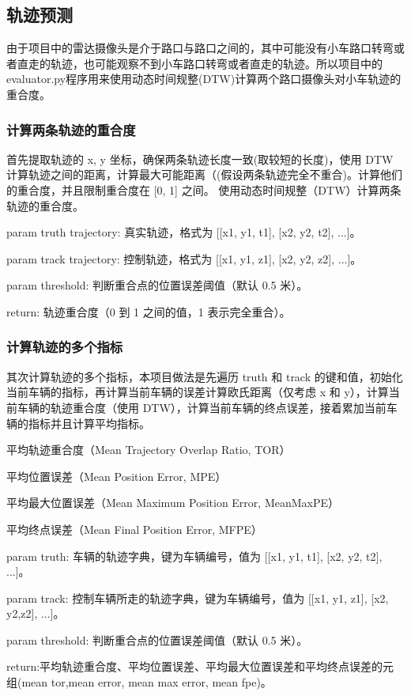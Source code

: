 \subsection{轨迹预测}
由于项目中的雷达摄像头是介于路口与路口之间的，其中可能没有小车路口转弯或者直走的轨迹，也可能观察不到小车路口转弯或者直走的轨迹。所以项目中的evaluator.py程序用来使用动态时间规整(DTW)计算两个路口摄像头对小车轨迹的重合度。
\subsubsection{计算两条轨迹的重合度}
首先提取轨迹的 x, y 坐标，确保两条轨迹长度一致(取较短的长度)，使用 DTW 计算轨迹之间的距离，计算最大可能距离（(假设两条轨迹完全不重合)。计算他们的重合度，并且限制重合度在 [0, 1] 之间。
使用动态时间规整（DTW）计算两条轨迹的重合度。

param truth trajectory: 真实轨迹，格式为 [[x1, y1, t1], [x2, y2, t2], ...]。

param track trajectory: 控制轨迹，格式为 [[x1, y1, z1], [x2, y2, z2], ...]。

param threshold: 判断重合点的位置误差阈值（默认 0.5 米）。

return: 轨迹重合度（0 到 1 之间的值，1 表示完全重合）。

\subsubsection{计算轨迹的多个指标}
其次计算轨迹的多个指标，本项目做法是先遍历 truth 和 track 的键和值，初始化当前车辆的指标，再计算当前车辆的误差计算欧氏距离（仅考虑 x 和 y），计算当前车辆的轨迹重合度（使用 DTW），计算当前车辆的终点误差，接着累加当前车辆的指标并且计算平均指标。

平均轨迹重合度（Mean Trajectory Overlap Ratio, TOR）

平均位置误差（Mean Position Error, MPE）

平均最大位置误差（Mean Maximum Position Error, MeanMaxPE）

平均终点误差（Mean Final Position Error, MFPE）

param truth: 车辆的轨迹字典，键为车辆编号，值为 [[x1, y1, t1], [x2, y2, t2], ...]。

param track: 控制车辆所走的轨迹字典，键为车辆编号，值为 [[x1, y1, z1], [x2, y2,z2], ...]。

param threshold: 判断重合点的位置误差阈值（默认 0.5 米）。

return:平均轨迹重合度、平均位置误差、平均最大位置误差和平均终点误差的元组(mean tor,mean error, mean max error, mean fpe)。


